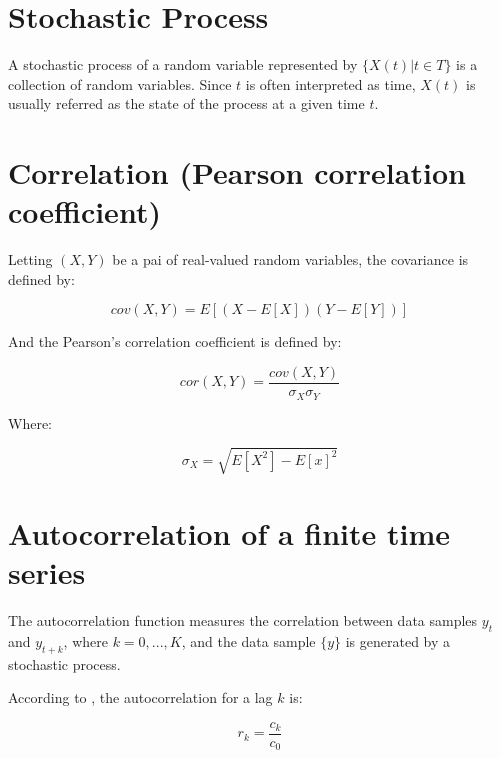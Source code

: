 \section{Stochastic Process}

A stochastic process of a random variable represented by $\{X(t)| t \in T\}$ is a collection of random variables. Since $t$ is often interpreted as time, $X (t) $ is usually referred as the state of the process at a given time $t$\cite{ross-probability}.

\section{Correlation (Pearson correlation coefficient)}

Letting $(X,Y)$ be a pai of real-valued random variables, the covariance is defined by:

\begin{equation}
cov(X, Y) = E[(X-E[X])(Y - E[Y])]
\end{equation}

And the Pearson's correlation coefficient is defined by:

\begin{equation}
cor(X, Y) = \frac{cov(X, Y)}{\sigma_X \sigma_Y}
\end{equation}

Where:

\begin{equation}
\sigma_X = \sqrt{  E[X^2] - E[x]^{2} } 
\end{equation}


\section{Autocorrelation of a finite time series}
The autocorrelation function measures the correlation between data samples $y_{t}$ and $y_{t + k}$, where $k =0, ..., K$, and the data sample $\{y\}$  is generated by a stochastic process.

According to \cite{book-time-series-analysis}, the autocorrelation for a lag $k$ is:

\begin{equation}
r_{k} = \frac{c_{k}}{c_{0}}
\end{equation}

